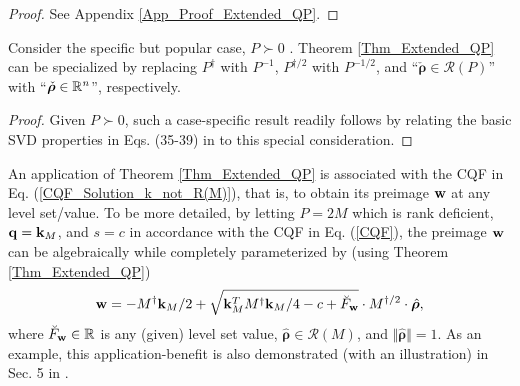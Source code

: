 \documentclass{imaman}
\newcommand{\beq}{\begin{eqnarray}}
\newcommand{\eeq}{\end{eqnarray}}
\newcommand{\bfq}{{\bf q}}
\newcommand{\bfw}{{\bf w}}
\newcommand{\bfk}{{\bf k}}
\newcommand{\bfrho}{{\boldsymbol \rho}}
\newcommand{\real}{\mathbb{R}}
\newcommand{\calR}{{\mathcal R}}
\newcommand{\itn}{{\it n}}
\numberwithin{equation}{section}
\begin{document}
\begin{proof}
See Appendix \ref{App_Proof_Extended_QP}.
\end{proof}

\begin{corollary}
Consider the specific but popular case, $P\succ 0$ {\rm\citep{Lu(Ye):03(16)}}. Theorem {\rm\ref{Thm_Extended_QP}} can be specialized by replacing $P^\dagger$ with $P^{-1}$, $P^{\dagger/2}$ with $P^{-1/2}$, and ``$\check\bfrho\in\calR(P)$'' with ``$\check\bfrho\in\real^\itn$'', respectively.
\end{corollary}

\begin{proof}
Given $P\succ 0$, such a case-specific result readily follows by relating the basic SVD properties in Eqs. (35-39) in \cite{LiLiHs:20} to this special consideration.
\end{proof}

\begin{remark}
An application of Theorem \ref{Thm_Extended_QP} is associated with the CQF
in Eq. (\ref{CQF_Solution_k_not_R(M)}), that is, to obtain its preimage $\bfw$ at any level set/value. To be more detailed, by letting $P=2M$ which is rank deficient, $\bfq=\bfk_M$, and $s=c$ in accordance with the CQF in Eq. (\ref{CQF}), the preimage $\bfw$ can be algebraically while completely parameterized by (using Theorem \ref{Thm_Extended_QP})
\beq
\bfw=-M^\dagger\bfk_M/2+\sqrt{\bfk_M^TM^\dagger\bfk_M/4-c+\breve F_\bfw}\cdot M^{\dagger/2}\cdot \hat\bfrho,
\label{Preimage_CQF_Solution_k_not_R(M)}
\eeq
where $\breve F_\bfw\in\real$ is any (given) level set value, $\hat\bfrho\in \calR(M)$, and $\Vert\hat\bfrho\Vert=1$. As an example, this application-benefit is also demonstrated (with an illustration) in Sec. 5 in \cite{LiLiHs:20}.
\label{Rem_Thm_Extended_QP_w}
\end{remark}
\end{document}
